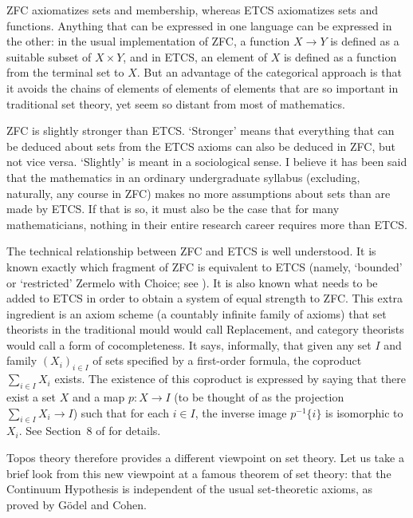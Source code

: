 \documentclass[12pt]{article}
\newcommand{\cln}{\colon}
\begin{document}
ZFC axiomatizes sets and membership, whereas ETCS axiomatizes sets and
functions.  Anything that can be expressed in one language can be expressed in
the other: in the usual implementation of ZFC, a function $X \to Y$ is
defined as a suitable subset of $X \times Y$, and in ETCS, an element of $X$
is defined as a function from the terminal set to $X$.  But an advantage of
the categorical approach is that it avoids the chains of elements of elements
of elements that are so important in traditional set theory, yet
seem so distant from most of mathematics.

ZFC is slightly stronger than ETCS.  `Stronger' means that everything that can
be deduced about sets from the ETCS axioms can also be deduced in ZFC, but not
vice versa.  `Slightly' is meant in a sociological sense.  I believe it has
been said that the mathematics in an ordinary undergraduate syllabus
(excluding, naturally, any course in ZFC) makes no more assumptions about sets
than are made by ETCS.  If that is so, it must also be the case that for many
mathematicians, nothing in their entire research career requires more than
ETCS.

The technical relationship between ZFC and ETCS is well understood.  It is
known exactly which fragment of ZFC is equivalent to ETCS (namely, `bounded'
or `restricted' Zermelo with Choice; see \citet{MaMo}).  It is also known what
needs to be added to ETCS in order to obtain a system of equal strength to
ZFC.  This extra ingredient is an axiom scheme (a countably infinite family of
axioms) that set theorists in the traditional mould would call Replacement,
and category theorists would call a form of cocompleteness.  It says,
informally, that given any set $I$ and family $(X_i)_{i \in I}$ of sets
specified by a first-order formula, the coproduct $\sum_{i \in I} X_i$ exists.
The existence of this coproduct is expressed by saying that there exist a set
$X$ and a map $p\cln X \to I$ (to be thought of as the projection $\sum_{i \in
I} X_i \to I$) such that for each $i \in I$, the inverse image $p^{-1}\{i\}$
is isomorphic to $X_i$.  See Section~8 of \citet{McLECS} for details.

Topos theory therefore provides a different viewpoint on set theory.  Let us
take a brief look from this new viewpoint at a famous theorem of set theory:
that the Continuum Hypothesis is independent of the usual set-theoretic
axioms, as proved by G\"odel and Cohen.
\end{document}
